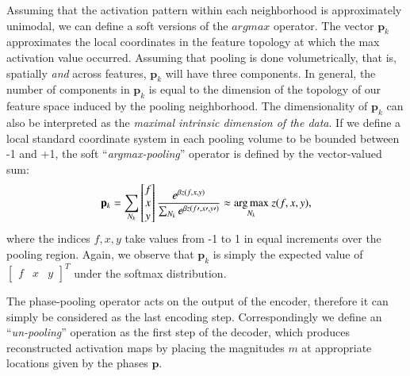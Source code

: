 Assuming that the activation pattern within each neighborhood is approximately unimodal, we can define a soft versions of the $argmax$ operator. The vector $\mathbf p_k$ approximates the local coordinates in the feature topology at which the max activation value occurred. Assuming that pooling is done volumetrically, that is, spatially \emph{and} across features, $\mathbf p_k$ will have three components. In general, the number of components in $\mathbf p_k$ is equal to the dimension of the topology of our feature space induced by the pooling neighborhood. The dimensionality of $\mathbf p_k$ can also be interpreted as the \emph{maximal intrinsic dimension of the data}. If we define a local standard coordinate system in each pooling volume to be bounded between -1 and +1, the soft ``\emph{argmax-pooling}'' operator is defined by the vector-valued sum:  
\begin{equation}
\mathbf p_k = \sum_{N_k}
\begin{bmatrix}
f \\ x \\ y
\end{bmatrix}
\frac{e^{\beta z(f,x,y)}}{\sum_{N_k}e^{\beta z(f\prime, x\prime, y\prime )}} \approx\underset{ N_k}{\operatorname*{arg\,max}}~z(f,x,y),
\label{eqn:phase}
\end{equation}   
where the indices $f,x,y$ take values from -1 to 1 in equal increments over the pooling region. 
Again, we observe that $\mathbf{p}_k$ is simply the expected value of $\begin{bmatrix}f&x&y\end{bmatrix}^T$ under the softmax distribution.

The phase-pooling operator acts on the output of the encoder, therefore it can simply be considered as the last encoding step. Correspondingly we define an ``\emph{un-pooling}'' operation as the first step of the decoder, which produces reconstructed activation maps by placing the magnitudes $m$ at appropriate locations given by the phases $\mathbf p$. 

